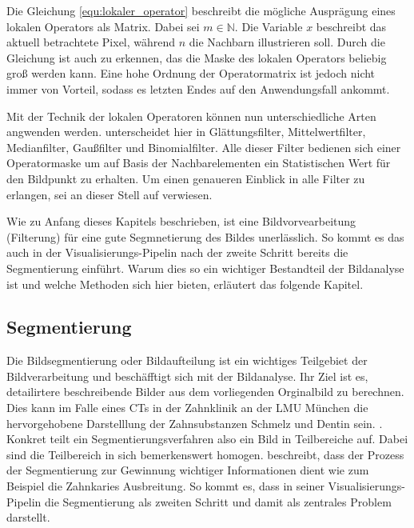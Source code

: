 Die Gleichung \ref{equ:lokaler_operator} beschreibt die mögliche Ausprägung eines
lokalen Operators als Matrix. Dabei sei $m \in \mathbb{N}$. Die Variable $x$ beschreibt
das aktuell betrachtete Pixel, während $n$ die Nachbarn illustrieren soll. Durch
die Gleichung ist auch zu erkennen, das die Maske des lokalen Operators beliebig
groß werden kann. Eine hohe Ordnung der Operatormatrix ist jedoch nicht immer von
Vorteil, sodass es letzten Endes auf den Anwendungsfall ankommt.

Mit der Technik der lokalen Operatoren können nun unterschiedliche Arten
angwenden werden. \citet[Seite 54 - 55]{handels2000} unterscheidet hier in Glättungsfilter,
Mittelwertfilter, Medianfilter, Gaußfilter und Binomialfilter. Alle dieser Filter
bedienen sich einer Operatormaske um auf Basis der Nachbarelementen ein Statistischen
Wert für den Bildpunkt zu erhalten. Um einen genaueren Einblick in alle Filter
zu erlangen, sei an dieser Stell auf \citet[Seite 54 - 55]{handels2000} verwiesen.

Wie zu Anfang dieses Kapitels beschrieben, ist eine Bildvorvearbeitung (Filterung)
für eine gute Segmnetierung des Bildes unerlässlich. So kommt es das auch in der
Visualisierungs-Pipelin nach \citet[Seite 50]{handels2000} der zweite Schritt bereits
die Segmentierung einführt. Warum dies so ein wichtiger Bestandteil der
Bildanalyse ist und welche Methoden sich hier bieten, erläutert das folgende Kapitel.

\pagebreak

\subsection{Segmentierung}
\label{subsec:segmentierung} Die Bildsegmentierung oder Bildaufteilung ist ein
wichtiges Teilgebiet der Bildverarbeitung und beschäfftigt sich mit der
Bildanalyse. Ihr Ziel ist es, detailirtere beschreibende Bilder aus dem
vorliegenden Orginalbild zu berechnen. Dies kann im Falle eines CTs in der Zahnklinik
an der LMU München die hervorgehobene Darstelllung der Zahnsubstanzen Schmelz und
Dentin sein. \citep[vgl.][Seite 359]{lehmann2013bildverarbeitung}. Konkret teilt
ein Segmentierungsverfahren also ein Bild in Teilbereiche auf. Dabei sind die
Teilbereich in sich bemerkenswert homogen. \citet[Seite 1]{ramesh2021} beschreibt,
dass der Prozess der Segmentierung zur Gewinnung wichtiger Informationen dient
wie zum Beispiel die Zahnkaries Ausbreitung. So kommt es, dass \citet[Seite 50]{handels2000}
in seiner Visualisierungs-Pipelin die Segmentierung als zweiten Schritt und
damit als zentrales Problem darstellt.

